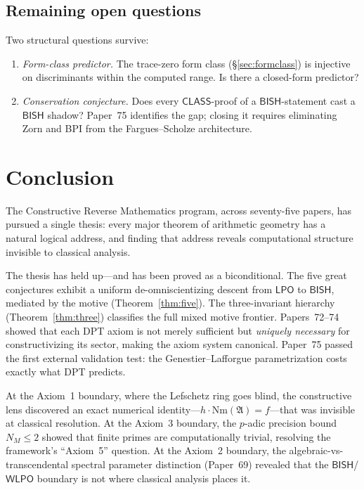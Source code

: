 \documentclass[11pt]{article}
\theoremstyle{plain}
\theoremstyle{definition}
\theoremstyle{remark}
\newcommand{\fA}{\mathfrak{A}}
\newcommand{\Nm}{\mathrm{Nm}}
\newcommand{\BISH}{\mathsf{BISH}}
\newcommand{\LPO}{\mathsf{LPO}}
\newcommand{\WLPO}{\mathsf{WLPO}}
\newcommand{\CLASS}{\mathsf{CLASS}}
\begin{document}
\subsection{Remaining open questions}

Two structural questions survive:
\begin{enumerate}
\item \emph{Form-class predictor.}  The trace-zero form class
  (\S\ref{sec:formclass}) is injective on discriminants within
  the computed range.  Is there a closed-form predictor?
\item \emph{Conservation conjecture.}  Does every $\CLASS$-proof
  of a $\BISH$-statement cast a $\BISH$ shadow?  Paper~75
  identifies the gap; closing it requires eliminating Zorn and
  BPI from the Fargues--Scholze architecture.
\end{enumerate}


\section{Conclusion}\label{sec:conclusion}

The Constructive Reverse Mathematics program, across seventy-five
papers, has pursued a single thesis: every major theorem of
arithmetic geometry has a natural logical address, and finding
that address reveals computational structure invisible to
classical analysis.

The thesis has held up---and has been proved as a biconditional.
The five great conjectures exhibit a
uniform de-omniscientizing descent from $\LPO$ to $\BISH$,
mediated by the motive (Theorem~\ref{thm:five}).  The
three-invariant hierarchy (Theorem~\ref{thm:three}) classifies
the full mixed motive frontier.  Papers~72--74 showed that each
DPT axiom is not merely sufficient but \emph{uniquely necessary}
for constructivizing its sector, making the axiom system canonical.
Paper~75 passed the first external validation test: the
Genestier--Lafforgue parametrization costs exactly what DPT predicts.

At the Axiom~1 boundary, where
the Lefschetz ring goes blind, the constructive lens discovered
an exact numerical identity---$h \cdot \Nm(\fA) = f$---that was
invisible at classical resolution.  At the Axiom~3 boundary, the
$p$-adic precision bound $N_M \le 2$ showed that finite primes
are computationally trivial, resolving the framework's
``Axiom~5'' question.  At the Axiom~2 boundary, the algebraic-vs-transcendental
spectral parameter distinction (Paper~69) revealed that the $\BISH$/$\WLPO$
boundary is not where classical analysis places it.
\end{document}
